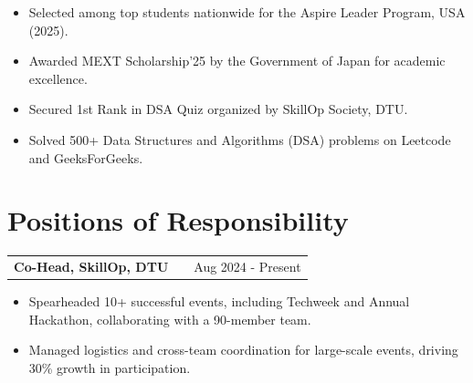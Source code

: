 \documentclass[a4paper,10pt]{article}
\makeatletter
\newenvironment{joblong}[2]
    {
    \begin{tabularx}{\linewidth}{@{}l X r@{}}
    \textbf{#1} & \hfill &  #2 \\[3.75pt]
    \end{tabularx}
    \begin{minipage}[t]{\linewidth}
    \begin{itemize}[nosep,after=\strut, leftmargin=1em, itemsep=3pt,label=--]
    }
    {
    \end{itemize}
    \end{minipage}    
    }
\makeatother
\begin{document}
\begin{itemize}[nosep,leftmargin=1.2em]
\item Selected among top students nationwide for the Aspire Leader Program, USA (2025).
\item Awarded MEXT Scholarship’25 by the Government of Japan for academic excellence.
\item Secured 1st Rank in DSA Quiz organized by SkillOp Society, DTU.
\item Solved 500+ Data Structures and Algorithms (DSA) problems on Leetcode and GeeksForGeeks.
\end{itemize}

\section{Positions of Responsibility}


\begin{joblong}{Co-Head, SkillOp, DTU}{Aug 2024 - Present}
\item Spearheaded 10+ successful events, including Techweek and Annual Hackathon, collaborating with a 90-member team.
\item Managed logistics and cross-team coordination for large-scale events, driving 30\% growth in participation.
\end{joblong}
\vspace{3pt}




\vfill
{}
\end{document}
